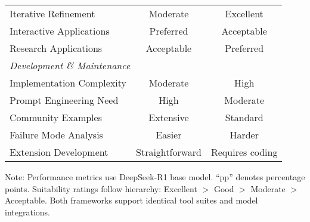 \begin{table}[htbp]
{\begin{tabular}{lcc}
Iterative Refinement & Moderate & Excellent \\
Interactive Applications & Preferred & Acceptable \\
Research Applications & Acceptable & Preferred \\
\hline
\multicolumn{3}{l}{\textit{Development \& Maintenance}} \\
Implementation Complexity & Moderate & High \\
Prompt Engineering Need & High & Moderate \\
Community Examples & Extensive & Standard \\
Failure Mode Analysis & Easier & Harder \\
Extension Development & Straightforward & Requires coding \\
\hline
\end{tabular}%
}
\begin{tablenotes}
\small
\item Note: Performance metrics use DeepSeek-R1 base model. “pp” denotes percentage points. Suitability ratings follow hierarchy: Excellent $>$ Good $>$ Moderate $>$ Acceptable. Both frameworks support identical tool suites and model integrations.
\end{tablenotes}
\end{table}
